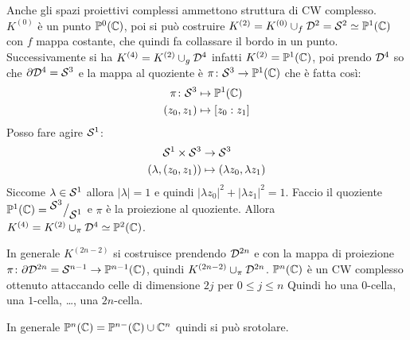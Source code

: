 
Anche gli spazi proiettivi complessi ammettono struttura di CW complesso.
$ K^{(0)} $ è un punto $ \mathbb{P}^{0} (\mathbb{C}) $, poi si può costruire
$ K^{(2)} = K^{(0)} \cup_f \mathcal{D}^{2} = \mathcal{S}^{2} \simeq \mathbb{P}^{1} (\mathbb{C}) $ con $ f $ mappa costante,
che quindi fa collassare il bordo in un punto. Successivamente si ha
$ K^{(4)} = K^{(2)} \cup_g \mathcal{D}^{4} $ infatti $ K^{(2)} = \mathbb{P}^{1} (\mathbb{C}) $, poi prendo
$ \mathcal{D}^{4} $ so che $ \partial \mathcal{D}^{4} = \mathcal{S}^{3} $ e la mappa al quoziente è
$ \pi \colon \mathcal{S}^{3} \to \mathbb{P}^{1} (\mathbb{C}) $ che è fatta così:
\begin{align*}
  \pi \colon \mathcal{S}^{3} & \mapsto \mathbb{P}^{1} (\mathbb{C}) \\
  (z_0, z_1) & \mapsto [z_0 : z_1]
\end{align*}
Posso fare agire $ \mathcal{S}^{1} $:
\begin{align*}
  \mathcal{S}^{1} \times \mathcal{S}^{3} & \to \mathcal{S}^{3} \\
  (\lambda, (z_0, z_1)) & \mapsto (\lambda z_0, \lambda z_1)
\end{align*}
Siccome $ \lambda \in \mathcal{S}^{1} $ allora $ | \lambda | = 1 $ e quindi $ | \lambda z_0 |^2 + | \lambda z_1 |^2 = 1 $.
Faccio il quoziente $ \mathbb{P}^{1} (\mathbb{C}) = {^{\textstyle \mathcal{S}^{3}}\big/_{\textstyle \mathcal{S}^{1}}} $ e $ \pi $ è la proiezione al
quoziente. Allora $ K^{(4)} = K^{(2)} \cup_\pi \mathcal{D}^{4} \simeq \mathbb{P}^{2} (\mathbb{C}) $.

In generale $ K^{(2n - 2)} $ si costruisce prendendo $ \mathcal{D}^{2n} $ e con la mappa
di proiezione $ \pi \colon \partial \mathcal{D}^{2n} = \mathcal{S}^{n-1} \to \mathbb{P}^{n-1} (\mathbb{C}) $, quindi $ K^{(2n -2)} \cup_\pi \mathcal{D}^{2n} $.
$ \mathbb{P}^{n} (\mathbb{C}) $ è un CW complesso ottenuto attaccando celle di dimensione $ 2j $ per $ 0 \leq j \leq n $
Quindi ho una $ 0 $-cella, una $ 1 $-cella, \dots, una $ 2n $-cella.

\begin{osservation}
  In generale $ \mathbb{P}^{n} (\mathbb{C}) = \mathbb{P}^{n-} (\mathbb{C}) \cup \mathbb{C}^n $ quindi si può srotolare.
\end{osservation}

